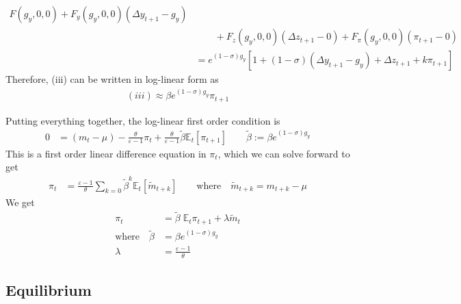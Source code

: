 \documentclass[12pt]{article}
\theoremstyle{plain}
\theoremstyle{definition}
\theoremstyle{remark}
\newcommand{\E}{\mathbb{E}}
\begin{document}
\begin{itemize}
\begin{enumerate}[label=(\roman*)]
\begin{align*}
          F(g_y,0,0)
          + F_y(g_y,0,0)(\Delta y_{t+1}-g_y)
          \\
          &\qquad
          + F_z(g_y,0,0)(\Delta z_{t+1}-0)
          + F_\pi(g_y,0,0)(\pi_{t+1}-0)
          \\
          &= e^{(1-\sigma)g_y}
          \left[
            1+(1-\sigma)(\Delta y_{t+1}-g_y)
            + \Delta z_{t+1}
            + k\pi_{t+1}
          \right]
        \end{align*}
        Therefore, (iii) can be written in log-linear form as
        \begin{align*}
          (iii) \approx
          \beta e^{(1-\sigma)g_y}\pi_{t+1}
        \end{align*}
    \end{enumerate}
    Putting everything together, the log-linear first order condition is
    \begin{align*}
      0 &=
      (m_t-\mu)
      - \frac{\theta}{\varepsilon-1} \pi_t
      + \frac{\theta}{\varepsilon-1}\tilde{\beta}\E_t[\pi_{t+1}]
      \qquad \tilde{\beta} := \beta e^{(1-\sigma)g_y}
    \end{align*}
    This is a first order linear difference equation in $\pi_t$, which
    we can solve forward to get
    \begin{align*}
       \pi_t
      &=
      \frac{\varepsilon-1}{\theta}
      \sum_{k=0} \tilde{\beta}^k
      \E_t[\tilde{m}_{t+k}]
      \qquad\text{where}\quad
      \tilde{m}_{t+k} = m_{t+k}-\mu
    \end{align*}
    We get
    \begin{align*}
      \pi_t &= \tilde{\beta}\;\E_t\pi_{t+1} + \lambda \tilde{m}_t
      \\
      \text{where}\quad
      \tilde{\beta} &=
        \beta e^{(1-\sigma)g_y} \\
      \lambda &=
        \frac{\varepsilon-1}{\theta}
    \end{align*}

\end{itemize}


\clearpage
\subsection{Equilibrium}
\end{document}
